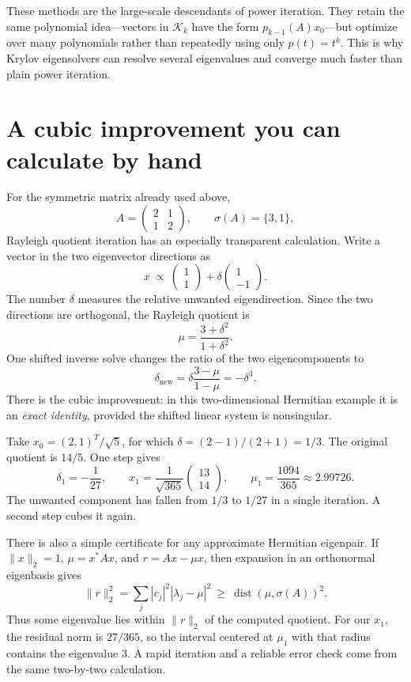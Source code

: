 These methods are the large-scale descendants of power iteration.  They retain the same polynomial idea---vectors in \(\mathcal K_k\) have the form \(p_{k-1}(A)x_0\)---but optimize over many polynomials rather than repeatedly using only \(p(t)=t^k\).  This is why Krylov eigensolvers can resolve several eigenvalues and converge much faster than plain power iteration.

\section{A cubic improvement you can calculate by hand}

For the symmetric matrix already used above,
\[
 A=\begin{pmatrix}2&1\\1&2\end{pmatrix},
 \qquad \sigma(A)=\{3,1\},
\]
Rayleigh quotient iteration has an especially transparent calculation. Write a vector in the two eigenvector directions as
\[
 x\ \propto\
 \begin{pmatrix}1\\1\end{pmatrix}
 +\delta\begin{pmatrix}1\\-1\end{pmatrix}.
\]
The number $\delta$ measures the relative unwanted eigendirection. Since the two directions are orthogonal, the Rayleigh quotient is
\[
 \mu=\frac{3+\delta^2}{1+\delta^2}.
\]
One shifted inverse solve changes the ratio of the two eigencomponents to
\[
 \delta_{\mathrm{new}}
   =\delta\frac{3-\mu}{1-\mu}
   =\boxed{-\delta^3}.
\]
There is the cubic improvement: in this two-dimensional Hermitian example it is an \emph{exact identity}, provided the shifted linear system is nonsingular.

Take $x_0=(2,1)^T/\sqrt5$, for which $\delta=(2-1)/(2+1)=1/3$. The original quotient is $14/5$. One step gives
\[
 \delta_1=-\frac1{27},\qquad
 x_1=\frac1{\sqrt{365}}\begin{pmatrix}13\\14\end{pmatrix},
 \qquad
 \mu_1=\frac{1094}{365}\approx2.99726.
\]
The unwanted component has fallen from $1/3$ to $1/27$ in a single iteration. A second step cubes it again.

There is also a simple certificate for any approximate Hermitian eigenpair. If $\|x\|_2=1$, $\mu=x^*Ax$, and $r=Ax-\mu x$, then expansion in an orthonormal eigenbasis gives
\[
 \|r\|_2^2
   =\sum_j |c_j|^2|\lambda_j-\mu|^2
   \ \ge\ \operatorname{dist}(\mu,\sigma(A))^2.
\]
Thus some eigenvalue lies within $\|r\|_2$ of the computed quotient. For our $x_1$, the residual norm is $27/365$, so the interval centered at $\mu_1$ with that radius contains the eigenvalue $3$. A rapid iteration and a reliable error check come from the same two-by-two calculation.
